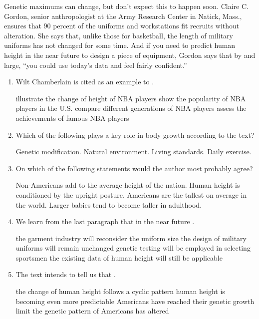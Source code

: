 Genetic maximums can change, but don't expect this to happen soon.
Claire
C. Gordon, senior anthropologist at the Army Research Center in
Natick, Mass., ensures that 90 percent of the uniforms and workstations
fit recruits without alteration. She says that, unlike those for
basketball, the length of military uniforms has not changed for some
time. And if you need to predict human height in the near future to
design a piece of equipment, Gordon says that by and large, ``you could
use today's data and feel fairly confident.''


\begin{enumerate}[resume]
	\item
Wilt Chamberlain is cited as an example to \lineread.


\fourchoices
{illustrate the change of height of NBA players}
{show the popularity of NBA players in the U.S.}
{compare different generations of NBA players}
{assess the achievements of famous NBA players}



\item
Which of the following plays a key role in body growth
according to the text?


\fourchoices
{Genetic modification.}
{Natural environment.}
{Living standards.}
{Daily exercise.}



\item
 On which of the following statements would the author most
probably agree?


\fourchoices
{Non-Americans add to the average height of the nation.}
{Human height is conditioned by the upright posture.}
{Americans are the tallest on average in the world.}
{Larger babies tend to become taller in adulthood.}


\item
 We learn from the last paragraph that in the near future \lineread.


\fourchoices
{the garment industry will reconsider the uniform size}
{the design of military uniforms will remain unchanged}
{genetic testing will be employed in selecting sportsmen}
{the existing data of human height will still be applicable}



\item
The text intends to tell us that \lineread.


\fourchoices
{the change of human height follows a cyclic pattern}
{human height is becoming even more predictable}
{Americans have reached their genetic growth limit}
{the genetic pattern of Americans has altered}

\end{enumerate}


